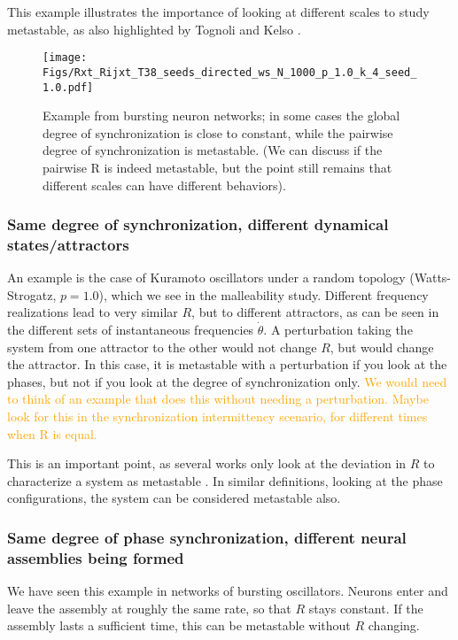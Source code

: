 \documentclass[preprint,superscriptaddress,showpacs,amsmath,amssymb,aps,pre,floatfix]{revtex4-1}
\theoremstyle{definition}
\begin{document}
This example illustrates the importance of looking at different scales to study metastable, as also highlighted by Tognoli and Kelso \cite{tognoli_2014, tognoli_2014a}.
%
\begin{figure}[H]
    \centering
    \texttt{[image: Figs/Rxt\_Rijxt\_T38\_seeds\_directed\_ws\_N\_1000\_p\_1.0\_k\_4\_seed\_1.0.pdf]}
    \caption{Example from bursting neuron networks; in some cases the global degree of synchronization is close to constant, while the pairwise degree of synchronization is metastable. (We can discuss if the pairwise R is indeed metastable, but the point still remains that different scales can have different behaviors).}
    \label{fig:case-scale}
\end{figure}


\subsubsection{Same degree of synchronization, different dynamical states/attractors}
An example is the case of Kuramoto oscillators under a random topology (Watts-Strogatz, $p = 1.0$), which we see in the malleability study. Different frequency realizations lead to very similar $R$, but to different attractors, as can be seen in the different sets of instantaneous frequencies $\dot{\theta}$. A perturbation taking the system from one attractor to the other would not change $R$, but would change the attractor. In this case, it is metastable with a  perturbation if you look at the phases, but not if you look at the degree of synchronization only. 
\textcolor{orange}{We would need to think of an example that does this without needing a perturbation. Maybe look for this in the synchronization intermittency scenario, for different times when R is equal.}

This is an important point, as several works only look at the deviation in $R$ to characterize a system as metastable \cite{deco_2016}. In similar definitions, looking at the phase configurations, the system can be considered metastable also.

\subsubsection{Same degree of phase synchronization, different neural assemblies being formed}
We have seen this example in networks of bursting oscillators. Neurons enter and leave the assembly at roughly the same rate, so that $R$ stays constant. If the assembly lasts a sufficient time, this can be metastable without $R$ changing.
\end{document}
